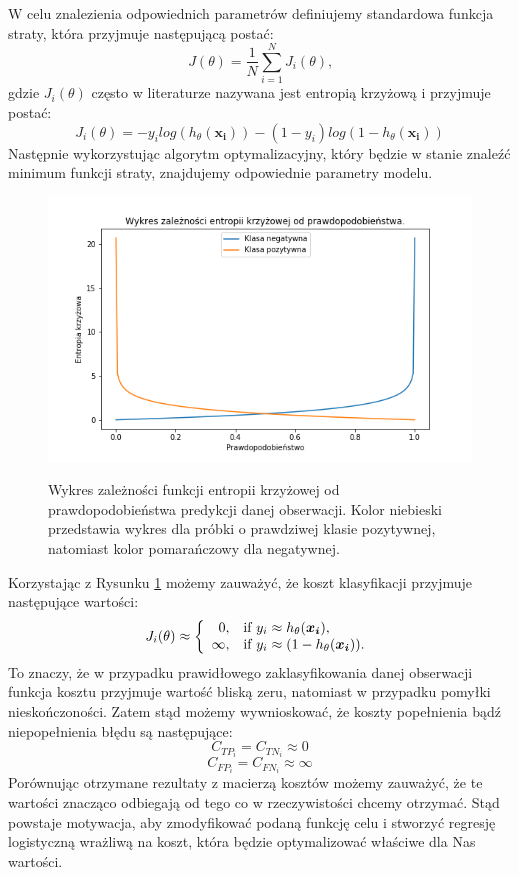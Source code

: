 \documentclass[openany]{book}
\begin{document}
	W celu znalezienia odpowiednich parametrów definiujemy standardowa funkcja straty, która przyjmuje następującą postać:
	$$ J(\theta) = \frac{1}{N} \sum_{i=1}^N J_i(\theta) \text{,}$$
	gdzie $J_i(\theta)$ często w literaturze nazywana jest entropią krzyżową i przyjmuje postać:
	\begin{equation}
	\label{c-e}
		J_i(\theta) = -y_i log(h_{\theta}(\boldsymbol{x_i})) - (1-y_i) log(1 - h_{\theta}(\boldsymbol{x_i}))
	\end{equation}
	Następnie wykorzystując algorytm optymalizacyjny, który będzie w stanie znaleźć minimum funkcji straty, znajdujemy odpowiednie parametry modelu.
	
	\begin{figure}[h]
		\includegraphics[width=\linewidth]{images/cross_entropy.png}
		\label{cross-entropy-plot}
		\caption{Wykres zależności funkcji entropii krzyżowej od prawdopodobieństwa predykcji danej obserwacji. Kolor niebieski przedstawia wykres dla próbki o prawdziwej klasie pozytywnej, natomiast kolor pomarańczowy dla negatywnej.}
	\end{figure}
	
    Korzystając z Rysunku \ref{cross-entropy-plot} możemy zauważyć, że koszt klasyfikacji przyjmuje następujące wartości:
	$$
	J_i(\theta) \approx \left\{
	\begin{array}{rl}
	0, &\mbox{if $y_i \approx h_{\theta}(\boldsymbol{x_i})$}, \\
	\infty, &\mbox{if $y_i \approx (1 - h_{\theta}(\boldsymbol{x_i}))$}.
	\end{array}{}
	\right.
	$$
	To znaczy, że w przypadku prawidłowego zaklasyfikowania danej obserwacji funkcja kosztu przyjmuje wartość bliską zeru, natomiast w przypadku pomyłki nieskończoności. Zatem stąd możemy wywnioskować, że koszty popełnienia bądź niepopełnienia błędu są następujące:
	$$ C_{TP_i} = C_{TN_i} \approx 0 $$
	$$ C_{FP_i} = C_{FN_i} \approx \infty $$
	Porównując otrzymane rezultaty z macierzą kosztów możemy zauważyć, że te wartości znacząco odbiegają od tego co w rzeczywistości chcemy otrzymać. Stąd powstaje motywacja, aby zmodyfikować podaną funkcję celu i stworzyć regresję logistyczną wrażliwą na koszt, która będzie optymalizować właściwe dla Nas wartości.
	
\end{document}
